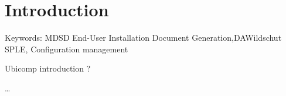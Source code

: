 
\chapter{Introduction}
\label{ch:Introduction}

Keywords: 
	MDSD
  	End-User Installation
  	Document Generation,DAWildschut
  	\cite{Catala2012}
 	SPLE, Configuration management
 	
 	Ubicomp introduction ?
 	
\cite{becker2008a}
\dots

